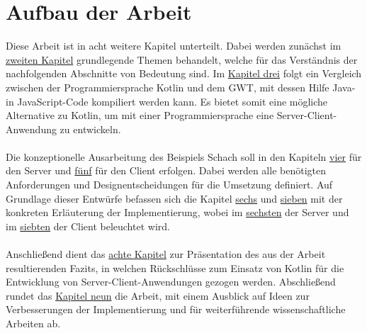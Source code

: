 \section{Aufbau der Arbeit}
Diese Arbeit ist in acht weitere Kapitel unterteilt. Dabei werden zunächst im \hyperref[chap:basics]{zweiten Kapitel} grundlegende Themen behandelt, welche für das Verständnis der nachfolgenden Abschnitte von Bedeutung sind. Im \hyperref[sec:comparison]{Kapitel drei} folgt ein Vergleich zwischen der Programmiersprache Kotlin und dem \gls{GWT}, mit dessen Hilfe Java- in JavaScript-Code kompiliert werden kann. Es bietet somit eine mögliche Alternative zu Kotlin, um mit einer Programmiersprache eine Server-Client-Anwendung zu entwickeln.\\
\\
Die konzeptionelle Ausarbeitung des Beispiels Schach soll in den Kapiteln \hyperref[sec:conceptServer]{vier} für den Server und \hyperref[sec:conceptClient]{fünf} für den Client erfolgen. Dabei werden alle benötigten Anforderungen und Designentscheidungen für die Umsetzung definiert. Auf Grundlage dieser Entwürfe befassen sich die Kapitel \hyperref[chap:implementationServer]{sechs} und \hyperref[chap:implementationClient]{sieben} mit der konkreten Erläuterung der Implementierung, wobei im \hyperref[chap:implementationServer]{sechsten} der Server und im \hyperref[chap:implementationClient]{siebten} der Client beleuchtet wird.\\
\\
Anschließend dient das \hyperref[chap:conclusion]{achte Kapitel} zur Präsentation des aus der Arbeit resultierenden Fazits, in welchen Rückschlüsse zum Einsatz von Kotlin für die Entwicklung von Server-Client-Anwendungen gezogen werden.
Abschließend rundet das \hyperref[chap:outlook]{Kapitel neun} die Arbeit, mit einem Ausblick auf Ideen zur Verbesserungen der Implementierung und für weiterführende wissenschaftliche Arbeiten ab.